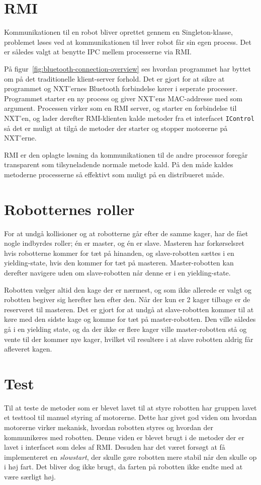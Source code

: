 \section{RMI}
Kommunikationen til en robot bliver oprettet gennem en Singleton-klasse, problemet løses ved at kommunikationen til hver robot får sin egen process. Det er således valgt at benytte IPC mellem processerne via RMI.


På figur~\vref{fig:bluetooth-connection-overview} ses hvordan programmet har byttet om på det traditionelle klient-server forhold. Det er gjort for at sikre at programmet og NXT'ernes Bluetooth forbindelse kører i seperate processer. Programmet starter en ny process og giver NXT'ens MAC-addresse med som argument. Processen virker som en RMI server, og starter en forbindelse til NXT'en, og lader derefter RMI-klienten kalde metoder fra et interfacet \texttt{IControl} så det er muligt at tilgå de metoder der starter og stopper motorerne på NXT'erne.

RMI er den oplagte løsning da kommunikationen til de andre processor foregår transparent som tilsyneladende normale metode kald. På den måde kaldes metoderne processerne så effektivt som muligt på en distribueret måde.

\section{Robotternes roller}
For at undgå kollisioner og at robotterne går efter de samme kager, har de fået nogle indbyrdes roller; én er master, og én er slave. Masteren har forkørselsret hvis robotterne kommer for tæt på hinanden, og slave-robotten sættes i en yielding-state, hvis den kommer for tæt på masteren. Master-robotten kan derefter navigere uden om slave-robotten når denne er i en yielding-state.

Robotten vælger altid den kage der er nærmest, og som ikke allerede er valgt og robotten begiver sig herefter hen efter den. Når der kun er 2 kager tilbage er de reserveret til masteren. Det er gjort for at undgå at slave-robotten kommer til at køre med den sidste kage og komme for tæt på master-robotten. Den ville således gå i en yielding state, og da der ikke er flere kager ville master-robotten stå og vente til der kommer nye kager, hvilket vil resultere i at slave robotten aldrig får afleveret kagen.

\section{Test}
Til at teste de metoder som er blevet lavet til at styre robotten har gruppen lavet et testtool til manuel styring af motorerne. Dette har givet god viden om hvordan motorerne virker mekanisk, hvordan robotten styres og hvordan der kommunikeres med robotten. Denne viden er blevet brugt i de metoder der er lavet i interfacet som deles af RMI. Desuden har det været forsøgt at få implementeret en \textit{slowstart}, der skulle gøre robotten mere stabil når den skulle op i høj fart. Det bliver dog ikke brugt, da farten på robotten ikke endte med at være særligt høj.

